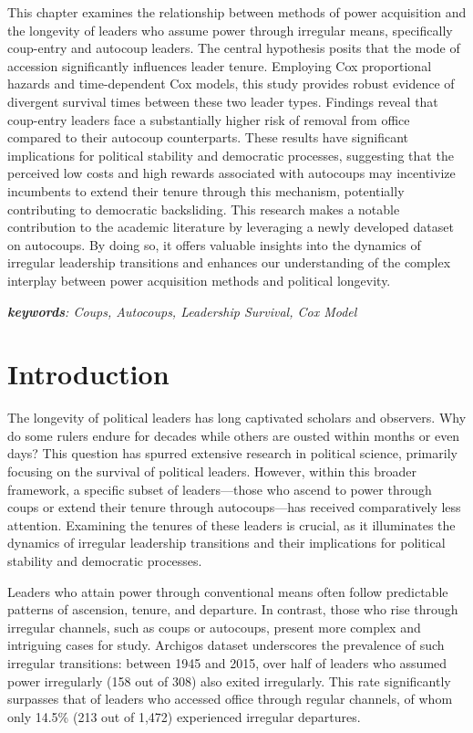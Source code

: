 \documentclass[
  12pt,
]{report}
\begin{document}
This chapter examines the relationship between methods of power
acquisition and the longevity of leaders who assume power through
irregular means, specifically coup-entry and autocoup leaders. The
central hypothesis posits that the mode of accession significantly
influences leader tenure. Employing Cox proportional hazards and
time-dependent Cox models, this study provides robust evidence of
divergent survival times between these two leader types. Findings reveal
that coup-entry leaders face a substantially higher risk of removal from
office compared to their autocoup counterparts. These results have
significant implications for political stability and democratic
processes, suggesting that the perceived low costs and high rewards
associated with autocoups may incentivize incumbents to extend their
tenure through this mechanism, potentially contributing to democratic
backsliding. This research makes a notable contribution to the academic
literature by leveraging a newly developed dataset on autocoups. By
doing so, it offers valuable insights into the dynamics of irregular
leadership transitions and enhances our understanding of the complex
interplay between power acquisition methods and political longevity.

\emph{\textbf{keywords}: Coups, Autocoups, Leadership Survival, Cox
Model}

\newpage

\section{Introduction}\label{introduction-3}

The longevity of political leaders has long captivated scholars and
observers. Why do some rulers endure for decades while others are ousted
within months or even days? This question has spurred extensive research
in political science, primarily focusing on the survival of political
leaders. However, within this broader framework, a specific subset of
leaders---those who ascend to power through coups or extend their tenure
through autocoups---has received comparatively less attention. Examining
the tenures of these leaders is crucial, as it illuminates the dynamics
of irregular leadership transitions and their implications for political
stability and democratic processes.

Leaders who attain power through conventional means often follow
predictable patterns of ascension, tenure, and departure. In contrast,
those who rise through irregular channels, such as coups or autocoups,
present more complex and intriguing cases for study. Archigos dataset
underscores the prevalence of such irregular transitions: between 1945
and 2015, over half of leaders who assumed power irregularly (158 out of
308) also exited irregularly. This rate significantly surpasses that of
leaders who accessed office through regular channels, of whom only
14.5\% (213 out of 1,472) experienced irregular departures.
\end{document}
